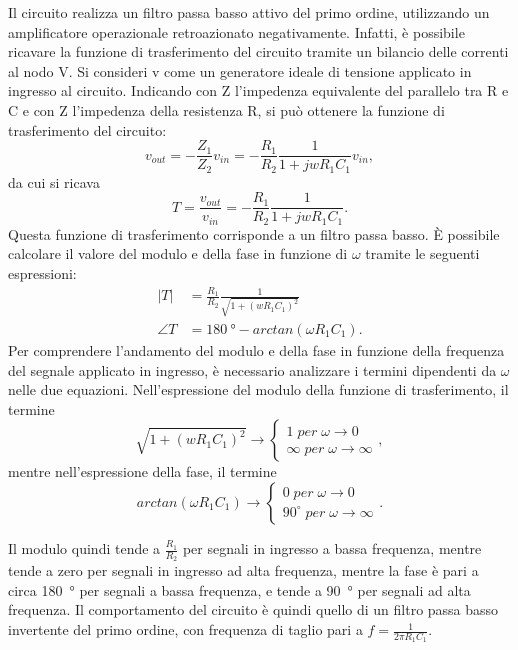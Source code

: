 Il circuito realizza un filtro passa basso attivo del primo ordine, utilizzando un amplificatore operazionale retroazionato negativamente. Infatti, è possibile ricavare la funzione di trasferimento del circuito tramite un bilancio delle correnti al nodo V\super{-}. Si consideri v come un generatore ideale di tensione applicato in ingresso al circuito. Indicando con Z l'impedenza equivalente del parallelo tra R e C e con Z l'impedenza della resistenza R, si può ottenere la funzione di trasferimento del circuito:
\begin{equation}
	v_{out}=-\frac{Z_1}{Z_2}v_{in}=-\frac{R_1}{R_2}\frac{1}{1+j w R_1 C_1} v_{in},
\end{equation}
da cui si ricava
\begin{equation}
	T=\frac{v_{out}}{v_{in}}=-\frac{R_1}{R_2}\frac{1}{1+j w R_1 C_1}.
\end{equation}
Questa funzione di trasferimento corrisponde a un filtro passa basso. È possibile calcolare il valore del modulo e della fase in funzione di $\omega$ tramite le seguenti espressioni:
\begin{equation}
	\begin{split}
		|T|&=\frac{R_1}{R_2}\frac{1}{\sqrt{1+(wR_1C_1)^2}} \\
		\angle T&=\SI{180}{\degree}-arctan(\omega R_1 C_1).
	\end{split}
\end{equation}
Per comprendere l'andamento del modulo e della fase in funzione della frequenza del segnale applicato in ingresso, è necessario analizzare i termini dipendenti da $\omega$ nelle due equazioni. Nell'espressione del modulo della funzione di trasferimento, il termine 
\begin{equation}
	\sqrt{1+(wR_1C_1)^2} \to
	\begin{cases}
		1 \; per \; \omega \to 0 \\
		\infty \; per \; \omega \to \infty
	\end{cases}
,
\end{equation}
mentre nell'espressione della fase, il termine
\begin{equation}
	arctan(\omega R_1 C_1) \to
	\begin{cases}
		0 \; per \; \omega \to 0 \\
		90^\circ \; per \; \omega \to \infty
	\end{cases}
	.
\end{equation}


Il modulo quindi tende a $\frac{R_1}{R_2}$ per segnali in ingresso a bassa frequenza, mentre tende a zero per segnali in ingresso ad alta frequenza, mentre la fase è pari a circa \SI{180}{\degree} per segnali a bassa frequenza, e tende a \SI{90}{\degree} per segnali ad alta frequenza.
Il comportamento del circuito è quindi quello di un filtro passa basso invertente del primo ordine, con frequenza di taglio pari a $f=\frac{1}{2\pi R_1C_1}$.

